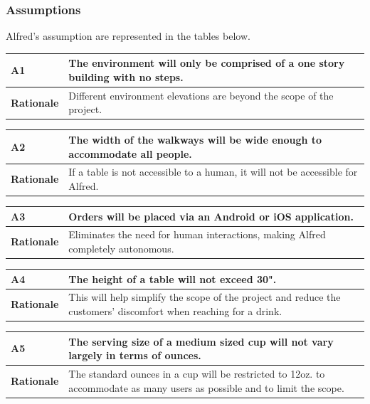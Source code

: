 \documentclass [11pt]{article}
\begin{document}
\subsubsection{Assumptions}
Alfred's assumption are represented in the tables below. 
\begin{longtable}{| p{ } | p{ } | }\hline 
\rowcolor{tableCell}\textbf{A1} & The environment will only be comprised of a one story building with no steps. \\ \hline
\textbf{Rationale} & Different environment elevations are beyond the scope of the project. \\ \hline 
\end{longtable}

\begin{longtable}{| p{ } | p{ } | }\hline 
\rowcolor{tableCell}\textbf{A2} & The width of the walkways will be wide enough to accommodate all people. \\ \hline
\textbf{Rationale} &  If a table is not accessible to a human, it will not be accessible for Alfred.\\ \hline
\end{longtable}

\begin{longtable}{| p{ } | p{ } | }\hline 
\rowcolor{tableCell}\textbf{A3} & Orders will be placed via an Android or iOS application. \\ \hline
\textbf{Rationale} &  Eliminates the need for human interactions, making Alfred completely autonomous. \\ \hline
\end{longtable}

\begin{longtable}{| p{ } | p{ } | }\hline 
\rowcolor{tableCell}\textbf{A4} & The height of a table will not exceed 30". \\ \hline
\textbf{Rationale} &  This will help simplify the scope of the project and reduce the customers' discomfort when reaching for a drink.\\ \hline
\end{longtable}

\begin{longtable}{| p{ } | p{ } | }\hline 
\rowcolor{tableCell}\textbf{A5} & The serving size of a medium sized cup will not vary largely in terms of ounces. \\ \hline
\textbf{Rationale} &  The standard ounces in a cup will be restricted to 12oz. to accommodate as many users as possible and to limit the scope. \\ \hline
\end{longtable}
\end{document}
